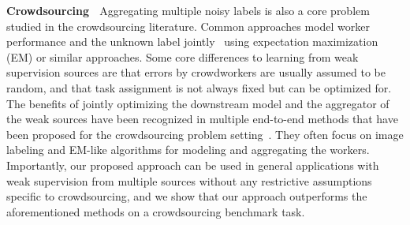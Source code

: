 \documentclass{article}
\begin{document}
\textbf{Crowdsourcing} $\;$
Aggregating multiple noisy labels is also a core problem studied in the crowdsourcing literature. Common approaches model worker performance and the unknown label jointly~\cite{SkeneModel,Crowdsourcing3,Crowdsourcing2} using expectation maximization (EM) or similar approaches. Some core differences to learning from weak supervision sources are that errors by crowdworkers  are usually assumed to be random, and that task assignment is not always fixed but can be optimized for. 
The benefits of jointly optimizing the downstream model and the aggregator of the weak sources have been recognized in multiple end-to-end methods that have been proposed for the crowdsourcing problem setting~\cite{raykar10a, doctorNet, Crowdsourcing4, khetan2017learning, rodrigues2018deep, MaxMIG}. They often focus on image labeling and EM-like algorithms for modeling and aggregating the workers.
Importantly, our proposed approach can be used in general applications with weak supervision from multiple sources without any restrictive assumptions specific to crowdsourcing, and we show that our approach outperforms the aforementioned methods on a crowdsourcing benchmark task.




 
\end{document}
